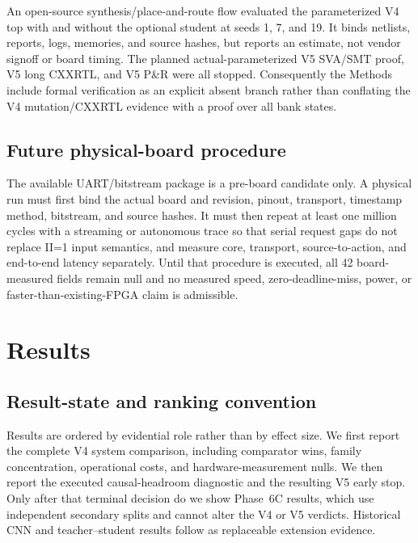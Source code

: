 \documentclass[11pt]{article}
\begin{document}
An open-source synthesis/place-and-route flow evaluated the parameterized V4
top with and without the optional student at seeds 1, 7, and 19.  It binds
netlists, reports, logs, memories, and source hashes, but reports an estimate,
not vendor signoff or board timing.  The planned actual-parameterized V5
SVA/SMT proof, V5 long CXXRTL, and V5 P\&R were all stopped.  Consequently the
Methods include formal verification as an explicit absent branch rather than
conflating the V4 mutation/CXXRTL evidence with a proof over all bank states.

\subsection{Future physical-board procedure}

The available UART/bitstream package is a pre-board candidate only.  A physical
run must first bind the actual board and revision, pinout, transport, timestamp
method, bitstream, and source hashes.  It must then repeat at least one million
cycles with a streaming or autonomous trace so that serial request gaps do not
replace II=1 input semantics, and measure core, transport, source-to-action, and
end-to-end latency separately.  Until that procedure is executed, all 42
board-measured fields remain null and no measured speed, zero-deadline-miss,
power, or faster-than-existing-FPGA claim is admissible.

\section{Results}

\subsection{Result-state and ranking convention}

Results are ordered by evidential role rather than by effect size.  We first
report the complete V4 system comparison, including comparator wins, family
concentration, operational costs, and hardware-measurement nulls.  We then
report the executed causal-headroom diagnostic and the resulting V5 early
stop.  Only after that terminal decision do we show Phase~6C results, which use
independent secondary splits and cannot alter the V4 or V5 verdicts.  Historical
CNN and teacher--student results follow as replaceable extension evidence.
\end{document}
